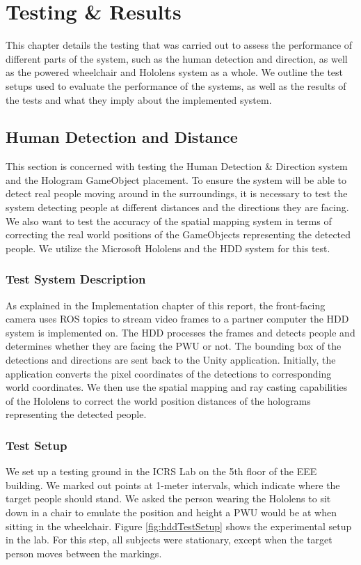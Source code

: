 \chapter{Testing \& Results}
This chapter details the testing that was carried out to assess the performance of different parts of the system, such as the human detection and direction, as well as the powered wheelchair and Hololens system as a whole. We outline the test setups used to evaluate the performance of the systems, as well as the results of the tests and what they imply about the implemented system.

\section{Human Detection and Distance}
This section is concerned with testing the Human Detection \& Direction system and the Hologram GameObject placement. To ensure the system will be able to detect real people moving around in the surroundings, it is necessary to test the system detecting people at different distances and the directions they are facing. We also want to test the accuracy of the spatial mapping system in terms of correcting the real world positions of the GameObjects representing the detected people. We utilize the Microsoft Hololens and the HDD system for this test.

\subsection{Test System Description} \label{sec:hddSys}
As explained in the Implementation chapter of this report, the front-facing camera uses ROS topics to stream video frames to a partner computer the HDD system is implemented on. The HDD processes the frames and detects people and determines whether they are facing the PWU or not. The bounding box of the detections and directions are sent back to the Unity application. Initially, the application converts the pixel coordinates of the detections to corresponding world coordinates. We then use the spatial mapping and ray casting capabilities of the Hololens to correct the world position distances of the holograms representing the detected people.

\subsection{Test Setup} \label{sec:testSetup}
We set up a testing ground in the ICRS Lab on the 5th floor of the EEE building. We marked out points at 1-meter intervals, which indicate where the target people should stand. We asked the person wearing the Hololens to sit down in a chair to emulate the position and height a PWU would be at when sitting in the wheelchair. Figure \ref{fig:hddTestSetup} shows the experimental setup in the lab. For this step, all subjects were stationary, except when the target person moves between the markings.

